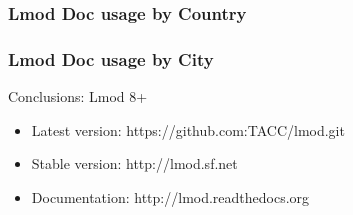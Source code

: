 \documentclass{beamer}
\begin{document}
\begin{frame}[fragile]
    \frametitle{Lmod Doc usage by Country}
\end{frame}

\begin{frame}[fragile]
    \frametitle{Lmod Doc usage by City}
\end{frame}

\begin{frame}{Conclusions: Lmod 8+}
  \begin{itemize}
    \item Latest version: https://github.com:TACC/lmod.git
    \item Stable version: http://lmod.sf.net
    \item Documentation:  http://lmod.readthedocs.org
  \end{itemize}
\end{frame}
\end{document}
